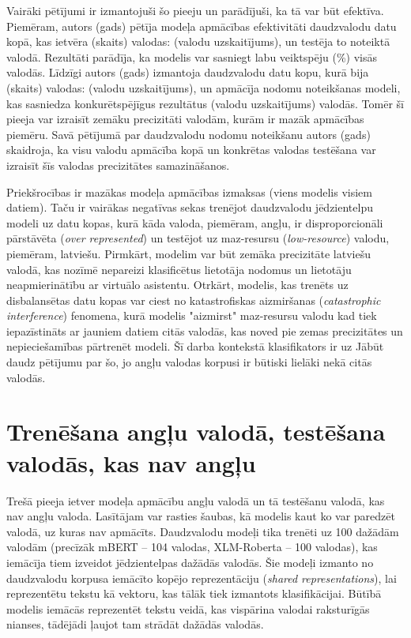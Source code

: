 Vairāki pētījumi ir izmantojuši šo pieeju un parādījuši, ka tā var būt efektīva. Piemēram, autors (gads) pētīja modeļa apmācības efektivitāti daudzvalodu datu kopā, kas ietvēra (skaits) valodas: (valodu uzskaitījums), un testēja to noteiktā valodā. Rezultāti parādīja, ka modelis var sasniegt labu veiktspēju (\%) visās valodās. Līdzīgi autors (gads) izmantoja daudzvalodu datu kopu, kurā bija (skaits) valodas: (valodu uzskaitījums), un apmācīja nodomu noteikšanas modeli, kas sasniedza konkurētspējīgus rezultātus (valodu uzskaitījums) valodās. Tomēr šī pieeja var izraisīt zemāku precizitāti valodām, kurām ir mazāk apmācības piemēru. Savā pētījumā par daudzvalodu nodomu noteikšanu autors (gads) skaidroja, ka visu valodu apmācība kopā un konkrētas valodas testēšana var izraisīt šīs valodas precizitātes samazināšanos.

Priekšrocības ir mazākas modeļa apmācības izmaksas (viens modelis visiem datiem). Taču ir vairākas negatīvas sekas trenējot daudzvalodu jēdzientelpu modeli uz datu kopas, kurā kāda valoda, piemēram, angļu, ir disproporcionāli pārstāvēta (\textit{over represented}) un testējot uz maz-resursu (\textit{low-resource}) valodu, piemēram, latviešu. Pirmkārt, modelim var būt zemāka precizitāte latviešu valodā, kas nozīmē nepareizi klasificētus lietotāja nodomus un lietotāju neapmierinātību ar virtuālo asistentu. Otrkārt, modelis, kas trenēts uz disbalansētas datu kopas var ciest no katastrofiskas aizmiršanas (\textit{catastrophic interference}) fenomena, kurā modelis "aizmirst" maz-resursu valodu kad tiek iepazīstināts ar jauniem datiem citās valodās, kas noved pie zemas precizitātes un nepieciešamības pārtrenēt modeli. Šī darba kontekstā klasifikators ir uz 
Jābūt daudz pētījumu par šo, jo angļu valodas korpusi ir būtiski lielāki nekā citās valodās.


\section{Trenēšana angļu valodā, testēšana valodās, kas nav angļu}

Trešā pieeja ietver modeļa apmācību angļu valodā un tā testēšanu valodā, kas nav angļu valoda. Lasītājam var rasties šaubas, kā modelis kaut ko var paredzēt valodā, uz kuras nav apmācīts. Daudzvalodu modeļi tika trenēti uz 100 dažādām valodām (precīzāk mBERT -- 104 valodas, XLM-Roberta -- 100 valodas), kas iemācīja tiem izveidot jēdzientelpas dažādās valodās. Šie modeļi izmanto no daudzvalodu korpusa iemācīto kopējo reprezentāciju (\textit{shared representations}), lai reprezentētu tekstu kā vektoru, kas tālāk tiek izmantots klasifikācijai. Būtībā modelis iemācās reprezentēt tekstu veidā, kas vispārina valodai raksturīgās nianses, tādējādi ļaujot tam strādāt dažādās valodās. 

